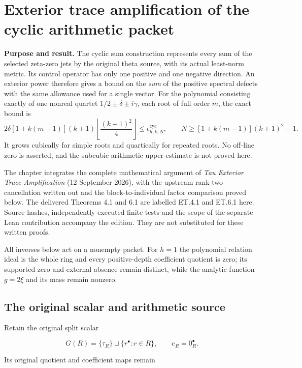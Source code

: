 \section{Exterior trace amplification of the cyclic arithmetic packet}
\label{sec:exterior-trace-amplification}

\textbf{Purpose and result.}
The cyclic sum construction represents every sum of the selected zeta-zero
jets by the original theta source, with its actual least-norm metric.
Its control operator has only one positive and one negative direction.
An exterior power therefore gives a bound on the \emph{sum} of the positive
spectral defects with the same allowance used for a single vector.
For the polynomial consisting exactly of one nonreal quartet
\(1/2\pm\delta\pm i\gamma\), each root of full order \(m\), the exact bound is
\[
2\delta[1+k(m-1)](k+1)
\left\lfloor\frac{(k+1)^2}{4}\right\rfloor
\leq\epsilon_{h,k,N}^{\mathrm{cyc}},
\qquad N\geq[1+k(m-1)](k+1)^2-1.
\]
It grows cubically for simple roots and quartically for repeated roots.
No off-line zero is asserted, and the subcubic arithmetic upper estimate
is not proved here.

The chapter integrates the complete mathematical argument of
\emph{Tau Exterior Trace Amplification} (12 September 2026), with the
upstream rank-two cancellation written out and the block-to-individual
factor comparison proved below. The delivered Theorems 4.1 and 6.1 are
labelled ET.4.1 and ET.6.1 here. Source hashes, independently executed
finite tests and the scope of the separate Lean contribution accompany
the edition. They are not substituted for these written proofs.

All inverses below act on a nonempty packet. For \(h=1\) the polynomial
relation ideal is the whole ring and every positive-depth coefficient
quotient is zero; its supported zero and external absence remain distinct,
while the analytic function \(g=2\xi\) and its mass remain nonzero.

\subsection{The original scalar and arithmetic
source}\label{exttrace-the-original-scalar-and-arithmetic-source}

Retain the original split scalar

\[
G(R)=\{\tau_R\}\sqcup\{r^\bullet:r\in R\},
\qquad e_R=0_R^\bullet.
\]

Its original quotient and coefficient maps remain

